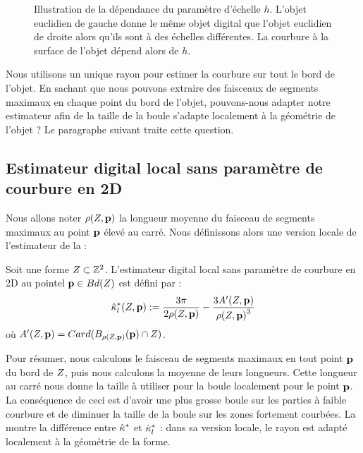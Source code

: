 \begin{figure}[ht]
  \begin{center}
    
  \end{center}
  \caption[Illustration de la dépendance du paramètre d'échelle $h$.]
  {Illustration de la dépendance du paramètre d'échelle $h$. L'objet euclidien
  de gauche donne le même objet digital que l'objet euclidien de droite alors
  qu'ils sont à des échelles différentes. La courbure à la surface de l'objet
  dépend alors de $h$.\label{fig:2d-parameter-free-explained}}
\end{figure}

Nous utilisons un unique rayon pour estimer la courbure sur tout le bord de
l'objet. En sachant que nous pouvons extraire des faisceaux de segments maximaux
en chaque point du bord de l'objet, pouvons-nous adapter notre estimateur afin
de la taille de la boule s'adapte localement à la géométrie de l'objet ? Le
paragraphe suivant traite cette question.
%
\subsection{Estimateur digital local sans paramètre de courbure en 2D}
%
Nous allons noter $\rho(Z,\mathbf{p})$ la longueur moyenne du faisceau de
segments maximaux au point $\mathbf{p}$ élevé au carré. Nous définissons alors une
version locale de l'estimateur de la
 :
%
\begin{definition}
  Soit une forme $Z \subset \mathbb{Z}^2$. L'estimateur digital local sans
  paramètre de courbure en 2D au pointel $\mathbf{p} \in Bd({Z})$ est défini par :
  \begin{equation}
    \hat{\kappa}^{*}_{l}(Z, \mathbf{p}) := \frac{3\pi}{2 \rho(Z,\mathbf{p})} - \frac{3 A'(Z,\mathbf{p})}{{\rho(Z,\mathbf{p})}^3}
  \end{equation}
  où $A'(Z, \mathbf{p}) = Card(B_{\rho(Z,\mathbf{p})}(\mathbf{p}) \cap
  Z)$.
\end{definition}
%
Pour résumer, nous calculons le faisceau de segments maximaux en tout point
$\mathbf{p}$ du bord de $Z$, puis nous calculons la moyenne de leurs longueurs.
Cette longueur au carré nous donne la taille à utiliser pour la boule localement
pour le point $\mathbf{p}$. La conséquence de ceci est d'avoir une plus grosse boule
sur les parties à faible courbure et de diminuer la taille de la boule sur les
zones fortement courbées. La  montre la
différence entre $\hat{\kappa}^{*}$ et $\hat{\kappa}^{*}_{l}$ : dans sa version locale, le rayon est
adapté localement à la géométrie de la forme.

